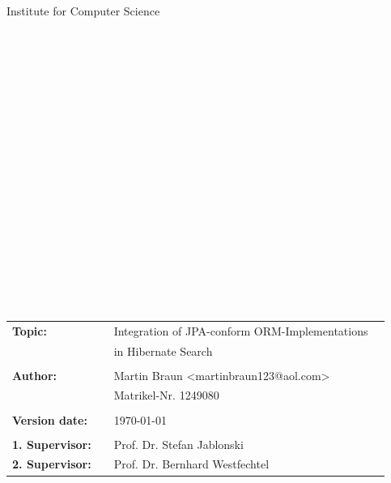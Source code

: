 \begin{center}
\Large{Institute for Computer Science}
\end{center}
\begin{verbatim}








\end{verbatim}
\begin{center}
\doublespacing
\textbf{\LARGE{\titleDocument}}\\
\singlespacing
\begin{verbatim}

\end{verbatim}
\textbf{{~\subjectDocument}}
\end{center}
\begin{verbatim}

\end{verbatim}
\begin{center}

\end{center}
\begin{verbatim}






\end{verbatim}
\begin{flushleft}
\begin{tabular}{llll}
\textbf{Topic:} & & Integration of JPA-conform ORM-Implementations & \\
	& & in Hibernate Search & \\
& & \\
\textbf{Author:} & & Martin Braun <martinbraun123@aol.com>& \\
& & Matrikel-Nr. 1249080 & \\
& & \\
\textbf{Version date:} & & \today &\\
& & \\
\textbf{1. Supervisor:} & & Prof. Dr. Stefan Jablonski &\\
\textbf{2. Supervisor:} & & Prof. Dr. Bernhard Westfechtel &\\
\end{tabular}
\end{flushleft}
%

























